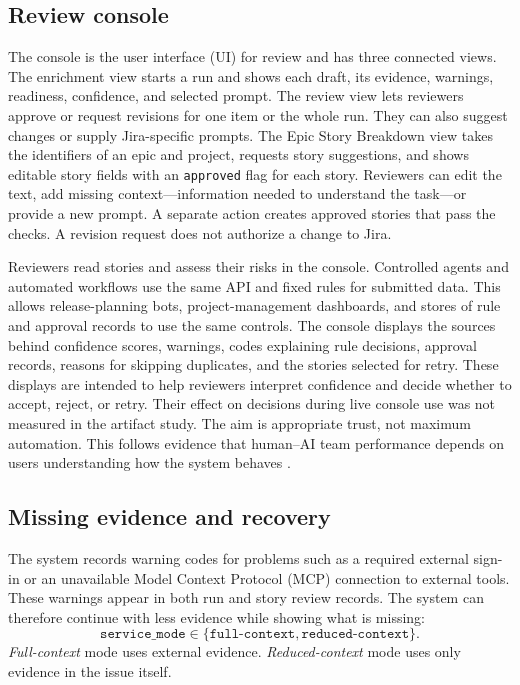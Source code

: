 \documentclass[10pt,a4paper]{article}
\begin{document}
\subsection{Review console}
The console is the user interface (UI) for review and has three connected views. The enrichment view starts a run and shows each draft, its evidence, warnings, readiness, confidence, and selected prompt. The review view lets reviewers approve or request revisions for one item or the whole run. They can also suggest changes or supply Jira-specific prompts. The Epic Story Breakdown view takes the identifiers of an epic and project, requests story suggestions, and shows editable story fields with an \texttt{approved} flag for each story. Reviewers can edit the text, add missing context---information needed to understand the task---or provide a new prompt. A separate action creates approved stories that pass the checks. A revision request does not authorize a change to Jira.

Reviewers read stories and assess their risks in the console. Controlled agents and automated workflows use the same API and fixed rules for submitted data. This allows release-planning bots, project-management dashboards, and stores of rule and approval records to use the same controls. The console displays the sources behind confidence scores, warnings, codes explaining rule decisions, approval records, reasons for skipping duplicates, and the stories selected for retry. These displays are intended to help reviewers interpret confidence and decide whether to accept, reject, or retry. Their effect on decisions during live console use was not measured in the artifact study. The aim is appropriate trust, not maximum automation. This follows evidence that human--AI team performance depends on users understanding how the system behaves \citep{R56,R57,R76}.

\subsection{Missing evidence and recovery}\label{sec:evidence-recovery}

The system records warning codes for problems such as a required external sign-in or an unavailable Model Context Protocol (MCP) connection to external tools. These warnings appear in both run and story review records. The system can therefore continue with less evidence while showing what is missing:
\begin{equation}
\texttt{service\_mode} \in \{\texttt{full-context},\texttt{reduced-context}\}.
\end{equation}
\textit{Full-context} mode uses external evidence. \textit{Reduced-context} mode uses only evidence in the issue itself.
\end{document}
